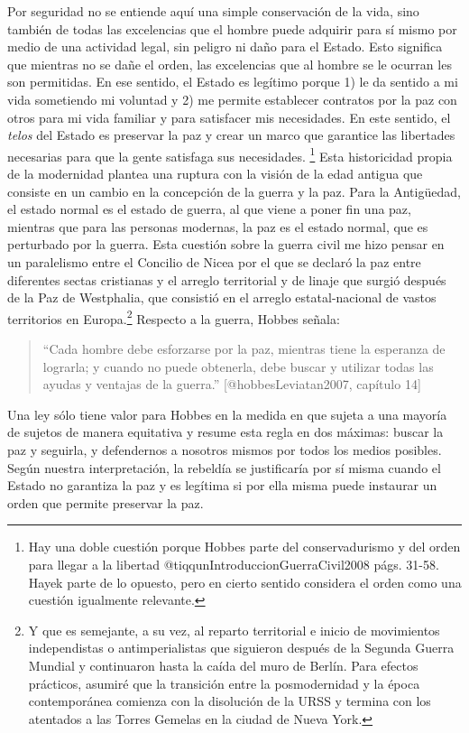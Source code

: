 \documentclass[
]{article}
\begin{document}
Por seguridad no se entiende aquí una simple conservación de la vida,
sino también de todas las excelencias que el hombre puede adquirir para
sí mismo por medio de una actividad legal, sin peligro ni daño para el
Estado. Esto significa que mientras no se dañe el orden, las excelencias
que al hombre se le ocurran les son permitidas. En ese sentido, el
Estado es legítimo porque 1) le da sentido a mi vida sometiendo mi
voluntad y 2) me permite establecer contratos por la paz con otros para
mi vida familiar y para satisfacer mis necesidades. En este sentido, el
\emph{telos} del Estado es preservar la paz y crear un marco que
garantice las libertades necesarias para que la gente satisfaga sus
necesidades. \footnote{Hay una doble cuestión porque Hobbes parte del
  conservadurismo y del orden para llegar a la libertad
  @tiqqunIntroduccionGuerraCivil2008 págs. 31-58. Hayek parte de lo
  opuesto, pero en cierto sentido considera el orden como una cuestión
  igualmente relevante.} Esta historicidad propia de la modernidad
plantea una ruptura con la visión de la edad antigua que consiste en un
cambio en la concepción de la guerra y la paz. Para la Antigüedad, el
estado normal es el estado de guerra, al que viene a poner fin una paz,
mientras que para las personas modernas, la paz es el estado normal, que
es perturbado por la guerra. Esta cuestión sobre la guerra civil me hizo
pensar en un paralelismo entre el Concilio de Nicea por el que se
declaró la paz entre diferentes sectas cristianas y el arreglo
territorial y de linaje que surgió después de la Paz de Westphalia, que
consistió en el arreglo estatal-nacional de vastos territorios en
Europa.\footnote{Y que es semejante, a su vez, al reparto territorial e
  inicio de movimientos independistas o antimperialistas que siguieron
  después de la Segunda Guerra Mundial y continuaron hasta la caída del
  muro de Berlín. Para efectos prácticos, asumiré que la transición
  entre la posmodernidad y la época contemporánea comienza con la
  disolución de la URSS y termina con los atentados a las Torres Gemelas
  en la ciudad de Nueva York.} Respecto a la guerra, Hobbes señala:

\begin{quote}
``Cada hombre debe esforzarse por la paz, mientras tiene la esperanza de
lograrla; y cuando no puede obtenerla, debe buscar y utilizar todas las
ayudas y ventajas de la guerra.'' {[}@hobbesLeviatan2007, capítulo 14{]}
\end{quote}

Una ley sólo tiene valor para Hobbes en la medida en que sujeta a una
mayoría de sujetos de manera equitativa y resume esta regla en dos
máximas: buscar la paz y seguirla, y defendernos a nosotros mismos por
todos los medios posibles. Según nuestra interpretación, la rebeldía se
justificaría por sí misma cuando el Estado no garantiza la paz y es
legítima si por ella misma puede instaurar un orden que permite
preservar la paz.
\end{document}
